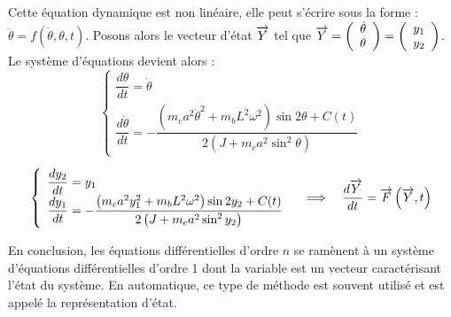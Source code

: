 \documentclass[10pt,fleqn]{article} %
\begin{document}
Cette équation dynamique est non linéaire, elle peut s’écrire sous la forme : $\ddot{\theta}=f(\dot{\theta},\theta,t)$. Posons alors le vecteur d’état $\overrightarrow{Y}$ tel que $\overrightarrow{Y}=\left(\begin{array}{c} \dot{\theta}\\ \theta \end{array}\right) =\left(\begin{array}{c} y_1 \\ y_2 \end{array}\right)$. 
Le système d’équations devient alors :
$$
\left\{\begin{array}{l}
\dfrac{d\theta}{dt} = \dot{\theta} \\
\dfrac{d\dot{\theta}}{dt} = - \dfrac{\left(m_c a^2 \dot{\theta}^2+m_b L^2 \omega^2 \right) \sin 2\theta +C(t)}{2\left(J+m_c a^2  \sin^2\theta\right)}
\end{array}\right.
$$

$$
\left\{\begin{array}{l}
\dfrac{dy_2}{dt} = y_1 \\
\dfrac{dy_1}{dt} = - \dfrac{\left(m_c a^2 y_1^2+m_b L^2 \omega^2 \right) \sin 2 y_2 +C(t)}{2\left(J+m_c a^2  \sin^2y_2\right)}
\end{array}\right.
\quad
\Longrightarrow
\quad
\dfrac{d\overrightarrow{Y}}{dt} = \overrightarrow{F}\left(\overrightarrow{Y},t\right)
$$


En conclusion, les équations différentielles d’ordre $n$ se ramènent à un système d’équations différentielles d’ordre 1 dont la variable est un vecteur caractérisant l’état du système. En automatique, ce type de méthode est souvent utilisé et est appelé la représentation d’état.


\begin{thebibliography}{2}
\end{thebibliography}
\end{document}
